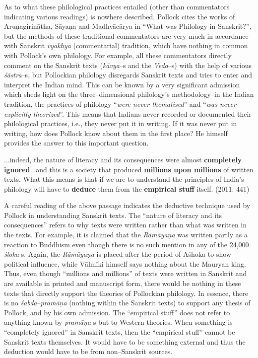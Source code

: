 As to what these philological practices entailed (other than commentators indicating various readings) is nowhere described. Pollock cites the works of Aruṇagirinātha, Sāyaṇa and Madhvācārya in “What was Philology in Sanskrit?”\textit{,} but the methods of these traditional commentators are very much in accordance with Sanskrit \textit{vyākhyā} (commentarial) tradition, which have nothing in common with Pollock’s own philology. For example, all these commentators directly comment on the Sanskrit texts (\textit{kāvya}–s and the \textit{Veda}–s) with the help of various\textit{ śāstra}–s, but Pollockian philology disregards Sanskrit texts and tries to enter and interpret the Indian mind. This can be known by a very significant admission which sheds light on the three–dimensional philology’s methodology–in the Indian tradition, the practices of philology “\textit{were never thematised}” and “\textit{was never explicitly theorized}”. This means that Indians never recorded or documented their philological practices, i.e., they never put it in writing. If it was never put in writing, how does Pollock know about them in the first place? He himself provides the answer to this important question.

\begin{myquote}
...indeed, the nature of literacy and its consequences were almost \textbf{completely ignored}...and this is a society that produced \textbf{millions upon millions} of written texts. What this means is that if we are to understand the principles of India’s philology will have to \textbf{deduce} them from the \textbf{empirical stuff} itself. (2011: 441)
\end{myquote}

A careful reading of the above passage indicates the deductive technique used by Pollock in understanding Sanskrit texts. The “nature of literacy and its consequences” refers to why texts were written rather than what was written in the texts. For example, it is claimed that the \textit{Rāmāyaṇa} was written partly as a reaction to Buddhism even though there is no such mention in any of the 24,000 \textit{śloka}-s. Again, the \textit{Rāmāyaṇa} is placed after the period of Aśhoka to show political influence, while Vālmīki himself says nothing about the Mauryan king. Thus, even though “millions and millions” of texts were written in Sanskrit and are available in printed and manuscript form, there would be nothing in these texts that directly support the theories of Pollockian philology. In essence, there is no \textit{śabda}–\textit{pramāṇa} (nothing within the Sanskrit texts) to support any thesis of Pollock, and by his own admission. The “empirical stuff” does not refer to anything known by \textit{pramāṇa}-s but to Western theories. When something is “completely ignored” in Sanskrit texts, then the “empirical stuff” cannot be Sanskrit texts themselves. It would have to be something external and thus the deduction would have to be from non–Sanskrit sources.

